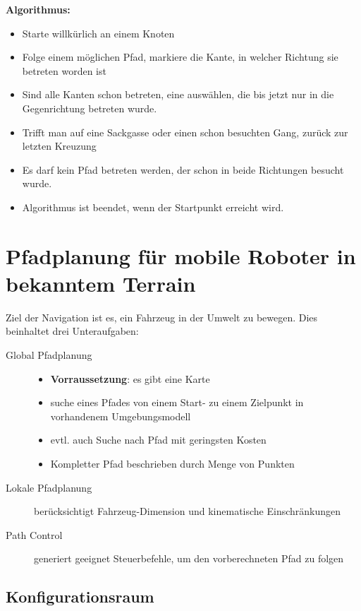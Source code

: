 \textbf{Algorithmus:}
\begin{itemize}
	\item Starte willkürlich an einem Knoten
	\item Folge einem möglichen Pfad, markiere die Kante, in welcher Richtung
		sie betreten worden ist
	\item Sind alle Kanten schon betreten, eine auswählen, die bis jetzt nur in
		die Gegenrichtung betreten wurde.
	\item Trifft man auf eine Sackgasse oder einen schon besuchten Gang, zurück
		zur letzten Kreuzung
	\item Es darf kein Pfad betreten werden, der schon in beide Richtungen
		besucht wurde.
	\item Algorithmus ist beendet, wenn der Startpunkt erreicht wird.
\end{itemize}

\section{Pfadplanung für mobile Roboter in bekanntem Terrain}
Ziel der Navigation ist es, ein Fahrzeug in der Umwelt zu bewegen.
Dies beinhaltet drei Unteraufgaben:
\begin{description}
	\item[Global Pfadplanung]
	\begin{itemize}
		\item \textbf{Vorraussetzung}: es gibt eine Karte
		\item suche eines Pfades von einem Start- zu einem Zielpunkt in vorhandenem Umgebungsmodell
		\item evtl. auch Suche nach Pfad mit geringsten Kosten
		\item Kompletter Pfad beschrieben durch Menge von Punkten
	\end{itemize}
	\item[Lokale Pfadplanung] berücksichtigt Fahrzeug-Dimension und kinematische
		Einschränkungen
	\item[Path Control] generiert geeignet Steuerbefehle, um den vorberechneten
		Pfad zu folgen
\end{description}

\subsection{Konfigurationsraum}
